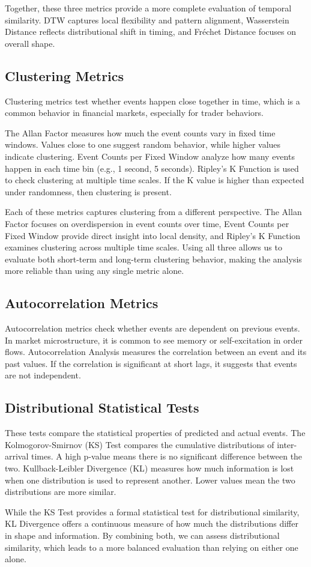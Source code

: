 Together, these three metrics provide a more complete evaluation of temporal similarity. DTW captures local flexibility and pattern alignment, Wasserstein Distance reflects distributional shift in timing, and Fréchet Distance focuses on overall shape.

\subsection{Clustering Metrics}
Clustering metrics test whether events happen close together in time, which is a common behavior in financial markets, especially for trader behaviors.

The Allan Factor measures how much the event counts vary in fixed time windows. Values close to one suggest random behavior, while higher values indicate clustering. Event Counts per Fixed Window analyze how many events happen in each time bin (e.g., 1 second, 5 seconds). Ripley's K Function is used to check clustering at multiple time scales. If the K value is higher than expected under randomness, then clustering is present.

Each of these metrics captures clustering from a different perspective. The Allan Factor focuses on overdispersion in event counts over time, Event Counts per Fixed Window provide direct insight into local density, and Ripley's K Function examines clustering across multiple time scales. Using all three allows us to evaluate both short-term and long-term clustering behavior, making the analysis more reliable than using any single metric alone.

\subsection{Autocorrelation Metrics}
Autocorrelation metrics check whether events are dependent on previous events. In market microstructure, it is common to see memory or self-excitation in order flows. Autocorrelation Analysis measures the correlation between an event and its past values. If the correlation is significant at short lags, it suggests that events are not independent.

\subsection{Distributional Statistical Tests}
These tests compare the statistical properties of predicted and actual events. The Kolmogorov-Smirnov (KS) Test compares the cumulative distributions of inter-arrival times. A high p-value means there is no significant difference between the two. Kullback-Leibler Divergence (KL) measures how much information is lost when one distribution is used to represent another. Lower values mean the two distributions are more similar.

While the KS Test provides a formal statistical test for distributional similarity, KL Divergence offers a continuous measure of how much the distributions differ in shape and information. By combining both, we can assess distributional similarity, which leads to a more balanced evaluation than relying on either one alone.


